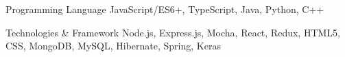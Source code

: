

\begin{cvskills}

  \cvskill
    {Programming Language} %
    {JavaScript/ES6+, TypeScript, Java, Python, C++} %

  \cvskill
    {Technologies \& Framework} %
    {Node.js, Express.js, Mocha, React, Redux, HTML5, CSS, MongoDB, MySQL, Hibernate, Spring, Keras} %


\end{cvskills}
